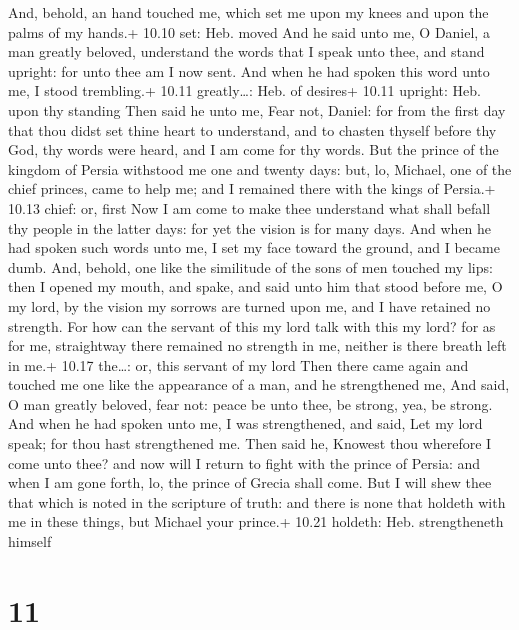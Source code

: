  And, behold, an hand touched me, which set me upon my
knees and upon the palms of my hands.+ 10.10 set: Heb. moved
 And he said unto me, O Daniel, a man greatly beloved,
understand the words that I speak unto thee, and stand upright: for unto
thee am I now sent. And when he had spoken this word unto me, I stood
trembling.+ 10.11 greatly\ldots: Heb. of desires+ 10.11 upright: Heb.
upon thy standing  Then said he unto me, Fear not, Daniel:
for from the first day that thou didst set thine heart to understand,
and to chasten thyself before thy God, thy words were heard, and I am
come for thy words.  But the prince of the kingdom of
Persia withstood me one and twenty days: but, lo, Michael, one of the
chief princes, came to help me; and I remained there with the kings of
Persia.+ 10.13 chief: or, first  Now I am come to make thee
understand what shall befall thy people in the latter days: for yet the
vision is for many days.  And when he had spoken such words
unto me, I set my face toward the ground, and I became dumb.
 And, behold, one like the similitude of the sons of men
touched my lips: then I opened my mouth, and spake, and said unto him
that stood before me, O my lord, by the vision my sorrows are turned
upon me, and I have retained no strength.  For how can the
servant of this my lord talk with this my lord? for as for me,
straightway there remained no strength in me, neither is there breath
left in me.+ 10.17 the\ldots: or, this servant of my lord 
Then there came again and touched me one like the appearance of a man,
and he strengthened me,  And said, O man greatly beloved,
fear not: peace be unto thee, be strong, yea, be strong. And when he had
spoken unto me, I was strengthened, and said, Let my lord speak; for
thou hast strengthened me.  Then said he, Knowest thou
wherefore I come unto thee? and now will I return to fight with the
prince of Persia: and when I am gone forth, lo, the prince of Grecia
shall come.  But I will shew thee that which is noted in
the scripture of truth: and there is none that holdeth with me in these
things, but Michael your prince.+ 10.21 holdeth: Heb. strengtheneth
himself

\hypertarget{section-10}{%
\section{11}\label{section-10}}

